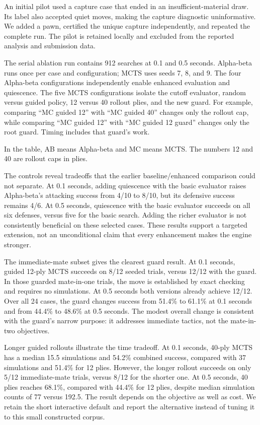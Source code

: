 \documentclass[oneside,final]{hcmut-report}
\begin{document}
An initial pilot used a capture case that ended in an insufficient-material
draw. Its label also accepted quiet moves, making the capture diagnostic
uninformative. We added a pawn, certified the unique capture independently,
and repeated the complete run. The pilot is retained locally and excluded
from the reported analysis and submission data.

The serial ablation run contains 912 searches at 0.1 and 0.5 seconds.
Alpha-beta runs once per case and configuration; MCTS uses seeds 7, 8, and 9.
The four Alpha-beta configurations independently enable enhanced evaluation
and quiescence. The five MCTS configurations isolate the cutoff evaluator,
random versus guided policy, 12 versus 40 rollout plies, and the new guard.
For example, comparing ``MC guided 12'' with ``MC guided 40'' changes only
the rollout cap, while comparing ``MC guided 12'' with ``MC guided 12 guard''
changes only the root guard. Timing includes that guard's work.

In the table, AB means Alpha-beta and MC means MCTS. The numbers 12 and 40
are rollout caps in plies.


The controls reveal tradeoffs that the earlier baseline/enhanced comparison
could not separate. At 0.1 seconds, adding quiescence with the basic
evaluator raises Alpha-beta's attacking success from 4/10 to 8/10, but its
defensive success remains 4/6. At 0.5 seconds, quiescence with
the basic evaluator succeeds on all six defenses, versus five for the
basic search. Adding the richer evaluator is not consistently beneficial
on these selected cases. These results support a targeted extension, not
an unconditional claim that every enhancement makes the engine stronger.

The immediate-mate subset gives the clearest guard result. At 0.1 seconds,
guided 12-ply MCTS succeeds on 8/12 seeded trials, versus 12/12 with the
guard. In those guarded mate-in-one trials, the move is established by
exact checking and requires no simulations. At 0.5 seconds both versions
already achieve 12/12. Over all 24 cases, the guard changes success from
51.4\% to 61.1\% at 0.1 seconds and from 44.4\% to 48.6\% at 0.5 seconds.
The modest overall change is consistent with the guard's narrow purpose:
it addresses immediate tactics, not the mate-in-two objectives.

Longer guided rollouts illustrate the time tradeoff. At 0.1 seconds,
40-ply MCTS has a median 15.5 simulations and 54.2\% combined success,
compared with 37 simulations and 51.4\% for 12 plies. However, the longer
rollout succeeds on only 5/12 immediate-mate trials, versus 8/12 for the
shorter one. At 0.5 seconds, 40 plies reaches 68.1\%, compared with 44.4\%
for 12 plies, despite median simulation counts of 77 versus 192.5.
The result depends on the objective as well as cost. We retain the short
interactive default and report the alternative instead of tuning it to
this small constructed corpus.
\end{document}
